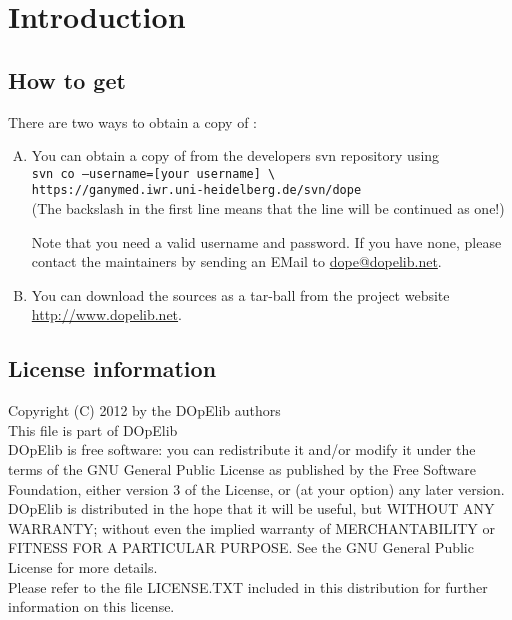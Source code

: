 \chapter{Introduction}\label{chap:intro}
\section{How to get \dope{}}\label{sec:obtain}
There are two ways to obtain a copy of \dope{}:\\

\begin{enumerate}[A)]
\item You can obtain a copy of \dope{} from the developers svn repository using\\
\texttt{svn co --username=[your username] \textbackslash \\ 
\hspace*{5mm}https://ganymed.iwr.uni-heidelberg.de/svn/dope}\\
(The backslash in the first line means that the line will be continued as one!)

Note that you need a valid username and password. If you have none, please contact the 
maintainers by sending an EMail to \url{dope@dopelib.net}.
%
\item You can download the sources as a tar-ball from the project website\\ 
\url{http://www.dopelib.net}.
\end{enumerate}


\section{License information}
Copyright (C) 2012 by the DOpElib authors\\[2mm]
%
This file is part of DOpElib\\[2mm]
%
DOpElib is free software: you can redistribute it
and/or modify it under the terms of the GNU General Public
License as published by the Free Software Foundation, either
version 3 of the License, or (at your option) any later
version.\\[2mm]
%
DOpElib is distributed in the hope that it will be
useful, but WITHOUT ANY WARRANTY; without even the implied
warranty of MERCHANTABILITY or FITNESS FOR A PARTICULAR
PURPOSE.  See the GNU General Public License for more
details.\\[2mm]
%
Please refer to the file LICENSE.TXT included in this distribution
for further information on this license.


